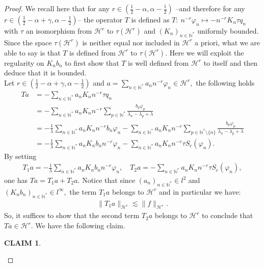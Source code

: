 \documentclass[11pt, dvipsnames]{amsart}
\newtheorem{claim}[theorem]{CLAIM}
\begin{document}
\begin{proof}
We recall here that for any $r\in \left(\frac{1}{2}-\alpha, \alpha-\frac{1}{2}\right)$ --and therefore for any $r\in \left(\frac{1}{2}-\alpha+\gamma, \alpha-\frac{1}{2}\right)$-- the operator $T$ is defined as $T:\ n^{-r}\varphi_n\mapsto -n^{-r}K_n\tau q_n$ with $\tau$ an isomorphism from $\mathcal{H}^r$ to $\tau(\mathcal{H}^r)$ and $(K_n)_{n\in \mathbb{N}^*}$ uniformly bounded. Since the space $\tau(\mathcal{H}^r)$ is neither equal nor included in $\mathcal{H}^r$ a priori, what we are able to say is that $T$ is defined from $\mathcal{H}^r$ to $\tau(\mathcal{H}^r).$ Here we will exploit the regularity on $K_n b_n$ to first show that $T$ is well defined from $\mathcal{H}^r$ to itself and then deduce that it is bounded.\\

Let $r\in \left(\frac{1}{2}-\alpha+\gamma, \alpha-\frac{1}{2}\right)$ and 
 $a=\displaystyle\sum_{n\in \mathbb{N}^*}a_n n^{-r}\varphi_n\in \mathcal{H}^r,$ the following holds
\begin{align*}
    Ta&=-\sum_{n\in \mathbb{N}^*}a_n K_n n^{-r}\tau q_n\\
    &=-\sum_{n\in \mathbb{N}^*}a_n K_n n^{-r}\sum_{p\in \mathbb{N}^*}\frac{b_p\varphi_p}{\lambda_n-\lambda_p+\lambda}\\
    &=-\frac{1}{\lambda}\sum_{n\in \mathbb{N}^*}a_n K_n n^{-r}b_n\varphi_n-\sum_{n\in \mathbb{N}^*}a_n K_n n^{-r}\sum_{p\in \mathbb{N}^*\setminus\{n\}}\frac{b_p\varphi_p}{\lambda_n-\lambda_p+\lambda}\\
    &=-\frac{1}{\lambda}\sum_{n\in \mathbb{N}^*}a_n K_nb_n n^{-r}\varphi_n-\sum_{n\in \mathbb{N}^*}a_n K_n n^{-r}\tau S_c(\varphi_n).
\end{align*}
By setting 
\begin{align*}
    T_1 a =-\frac{1}{\lambda}\sum_{n\in \mathbb{N}^*}a_n K_nb_n n^{-r}\varphi_n, \quad T_2 a=-\sum_{n\in \mathbb{N}^*}a_n K_n n^{-r}\tau S_c(\varphi_n),
\end{align*} one has $Ta=T_1a+T_2a.$
Notice that since $(a_n)_{n\in \mathbb{N}^*}\in l^2$ and $(K_n b_n)_{n\in \mathbb{N}^*}\in l^{\infty},$ the term $T_1 a$ belongs to $\mathcal{H}^r$ and in particular we have:
\begin{align}
    \|T_1 a\|_{\mathcal{H}^r}\lesssim  \|f\|_{\mathcal{H}^r}.\label{T_1}
\end{align} 
So, it suffices to show that the second term $T_2 a$ belongs to $\mathcal{H}^r$ to conclude that $Ta\in \mathcal{H}^r$. 
We have the following claim.
\begin{claim}\label{Claim1}

\end{claim}
\end{proof}
\end{document}
